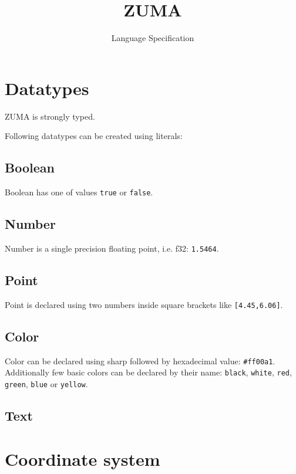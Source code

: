 \documentclass{scrreprt}
\title{ZUMA}
\subtitle{Language Specification}
\date{}
\author{}
\begin{document}

\maketitle

\tableofcontents

\newpage


\chapter{Datatypes}

ZUMA is strongly typed.

Following datatypes can be created using literals:

\section{Boolean}

Boolean has one of values \texttt{true} or \texttt{false}.

\section{Number}

Number is a single precision floating point, i.e. f32: \texttt{1.5464}.

\section{Point}

Point is declared using two numbers inside square brackets like \texttt{[4.45,6.06]}.

\section{Color}

Color can be declared using sharp followed by hexadecimal value: \texttt{\#ff00a1}. Additionally few basic colors can be declared by their name: \texttt{black}, \texttt{white}, \texttt{red}, \texttt{green}, \texttt{blue} or \texttt{yellow}.

\section{Text}

\chapter{Coordinate system}
\end{document}
